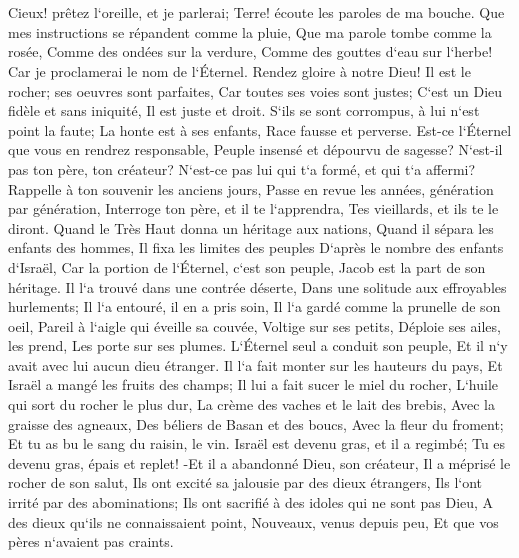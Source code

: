 \chapter{}

\verse Cieux! prêtez l`oreille, et je parlerai; Terre! écoute les paroles de ma bouche. 
\verse Que mes instructions se répandent comme la pluie, Que ma parole tombe comme la rosée, Comme des ondées sur la verdure, Comme des gouttes d`eau sur l`herbe! 
\verse Car je proclamerai le nom de l`Éternel. Rendez gloire à notre Dieu! 
\verse Il est le rocher; ses oeuvres sont parfaites, Car toutes ses voies sont justes; C`est un Dieu fidèle et sans iniquité, Il est juste et droit. 
\verse S`ils se sont corrompus, à lui n`est point la faute; La honte est à ses enfants, Race fausse et perverse. 
\verse Est-ce l`Éternel que vous en rendrez responsable, Peuple insensé et dépourvu de sagesse? N`est-il pas ton père, ton créateur? N`est-ce pas lui qui t`a formé, et qui t`a affermi? 
\verse Rappelle à ton souvenir les anciens jours, Passe en revue les années, génération par génération, Interroge ton père, et il te l`apprendra, Tes vieillards, et ils te le diront. 
\verse Quand le Très Haut donna un héritage aux nations, Quand il sépara les enfants des hommes, Il fixa les limites des peuples D`après le nombre des enfants d`Israël, 
\verse Car la portion de l`Éternel, c`est son peuple, Jacob est la part de son héritage. 
\verse Il l`a trouvé dans une contrée déserte, Dans une solitude aux effroyables hurlements; Il l`a entouré, il en a pris soin, Il l`a gardé comme la prunelle de son oeil, 
\verse Pareil à l`aigle qui éveille sa couvée, Voltige sur ses petits, Déploie ses ailes, les prend, Les porte sur ses plumes. 
\verse L`Éternel seul a conduit son peuple, Et il n`y avait avec lui aucun dieu étranger. 
\verse Il l`a fait monter sur les hauteurs du pays, Et Israël a mangé les fruits des champs; Il lui a fait sucer le miel du rocher, L`huile qui sort du rocher le plus dur, 
\verse La crème des vaches et le lait des brebis, Avec la graisse des agneaux, Des béliers de Basan et des boucs, Avec la fleur du froment; Et tu as bu le sang du raisin, le vin. 
\verse Israël est devenu gras, et il a regimbé; Tu es devenu gras, épais et replet! -Et il a abandonné Dieu, son créateur, Il a méprisé le rocher de son salut, 
\verse Ils ont excité sa jalousie par des dieux étrangers, Ils l`ont irrité par des abominations; 
\verse Ils ont sacrifié à des idoles qui ne sont pas Dieu, A des dieux qu`ils ne connaissaient point, Nouveaux, venus depuis peu, Et que vos pères n`avaient pas craints. 
